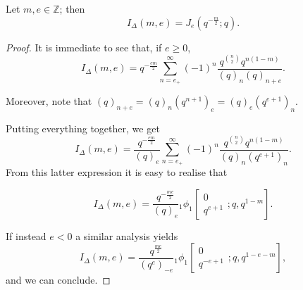 \documentclass[10pt,a4paper]{amsart}
\newcommand{\Z}{\mathbb{Z}}
\newcommand{\tet}{I_{\Delta}}
\begin{document}
\begin{prop}\label{prop:equivalence}
Let $m,e \in \Z$; then
$$\tet \left(m,e\right) = J_e \left(q^{-\frac{m}{2}};q\right).$$
\end{prop}

\begin{proof}
It is immediate to see that, if $e \ge 0$,
$$I_\Delta \left(m,e\right) = q^{-\frac{em}{2}}\sum_{n = e_+}^\infty \left(-1\right)^n \frac{q^{\binom{n}{2}} q^{n\left(1-m\right)}}{\left(q\right)_n \left(q\right)_{n+e}}. $$

Moreover, note that $\left(q\right)_{n+e} = \left(q\right)_n \left(q^{n+1}\right)_e = \left(q\right)_{e} \left(q^{e+1}\right)_n$.

Putting everything together, we get
$$I_\Delta \left(m,e\right) = \frac{q^{-\frac{em}{2}}}{\left(q\right)_e}\sum_{n = e_+}^\infty \left(-1\right)^n \frac{q^{\binom{n}{2}} q^{n\left(1-m\right)}}{\left(q\right)_n \left(q^{e+1}\right)_{n}}.$$
From this latter expression it is easy to realise that

\begin{equation}\label{eqn:index_qhyper_positive}
I_\Delta \left(m,e\right) = \frac{q^{-\frac{me}{2}}}{\left(q\right)_e} {_1 \phi_1}\left[\begin{matrix} 0  \\ q^{e+1}  \end{matrix} ; q,q^{1-m} \right].
\end{equation}

If instead $e<0$ a similar analysis yields
\begin{equation}\label{eqn:index_qhyper_negative}
I_\Delta \left(m,e\right) = \frac{q^{\frac{me}{2}}}{\left(q^e\right)_{-e}} {_1 \phi_1}\left[\begin{matrix} 0  \\ q^{-e+1}  \end{matrix} ; q,q^{1-e-m} \right],
\end{equation}
and we can conclude.
\end{proof}
\end{document}
